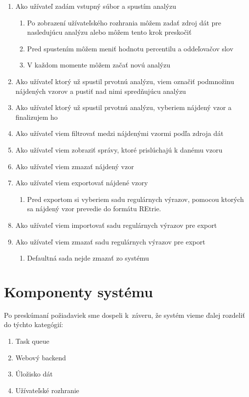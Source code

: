 \begin{enumerate}
  \item Ako užívateľ zadám vstupný súbor a spustím analýzu
  \begin{enumerate}
  	\item Po zobrazení užívateľského rozhrania môžem zadať zdroj dát pre nasledujúcu analýzu alebo môžem tento krok preskočiť
  	\item Pred spustením môžem meniť hodnotu percentilu a oddeľovačov slov
  	\item V každom momente môžem začať novú analýzu
  \end{enumerate}
  \item Ako užívateľ ktorý už spustil prvotnú analýzu, viem označiť podmnožinu nájdených vzorov a pustiť nad nimi spredňujúcu analýzu
  \item Ako užívateľ ktorý už spustil prvotnú analýzu, vyberiem nájdený vzor a finalizujem ho
  \item Ako užívateľ viem filtrovať medzi nájdenými vzormi podľa zdroja dát
  \item Ako užívateľ viem zobraziť správy, ktoré prislúchajú k danému vzoru
  \item Ako užívateľ viem zmazať nájdený vzor
  \item Ako užívateľ viem exportovať nájdené vzory
  \begin{enumerate}
  	\item Pred exportom si vyberiem sadu regulárnych výrazov, pomocou ktorých sa nájdený vzor prevedie do formátu REtrie.
  \end{enumerate}
  \item Ako užívateľ viem importovať sadu regulárnych výrazov pre export
  \item Ako užívateľ viem zmazať sadu regulárnych výrazov pre export
  \begin{enumerate}
  	\item Defaultná sada nejde zmazať zo systému
  \end{enumerate}
\end{enumerate}

\section{Komponenty systému}
Po preskúmaní požiadaviek sme dospeli k~záveru, že systém vieme ďalej rozdeliť do týchto kategógií:

\begin{enumerate}
  \item Task queue
  \item Webový backend
  \item Úložisko dát
  \item Užívateľské rozhranie
\end{enumerate}

